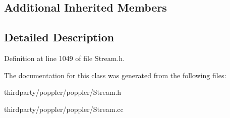 \subsection*{Additional Inherited Members}


\subsection{Detailed Description}


Definition at line 1049 of file Stream.\+h.



The documentation for this class was generated from the following files\+:\begin{DoxyCompactItemize}
\item 
thirdparty/poppler/poppler/Stream.\+h\item 
thirdparty/poppler/poppler/Stream.\+cc\end{DoxyCompactItemize}
